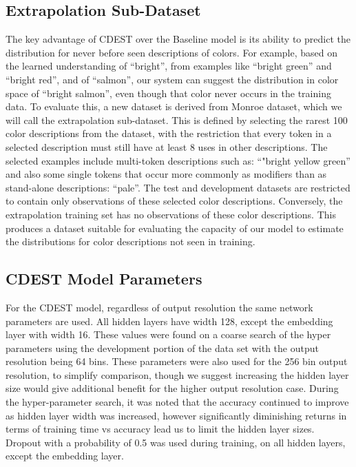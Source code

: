 \documentclass[11pt,letterpaper]{article}
\newcommand{\parencite}{\cite}
\begin{document}
\subsection{Extrapolation Sub-Dataset}
The key advantage of CDEST over the Baseline model is its ability to predict the distribution for never before seen descriptions of colors.
For example, based on the learned understanding of ``bright'', from examples like ``bright green'' and ``bright red'', and of ``salmon'', our system can suggest the distribution in color space of ``bright salmon'', even though that color never occurs in the training data.
To evaluate this, a new dataset is derived from Monroe dataset, which we will call the extrapolation sub-dataset.
This is defined by selecting the rarest 100 color descriptions from the dataset,
with the restriction that every token in a selected description must still have at least 8 uses in other descriptions.
The selected examples include multi-token descriptions such as: ``"bright yellow green'' and also some single tokens that occur more commonly as modifiers than as stand-alone descriptions: ``pale''.
The test and development datasets are restricted to contain only observations of these selected color descriptions.
Conversely, the extrapolation training set has no observations of these color descriptions.
This produces a dataset suitable for evaluating the capacity of our model to estimate the distributions for color descriptions not seen in training.

\subsection{CDEST Model Parameters}
For the CDEST model, regardless of output resolution the same network parameters are used.
All hidden layers have width 128, except the embedding layer with width 16.
These values were found on a coarse search of the hyper parameters using the development portion of the data set with the output resolution being 64 bins.
These parameters were also used for the 256 bin output resolution, to simplify comparison, though we suggest increasing the hidden layer size would give additional benefit for the higher output resolution case.
During the hyper-parameter search, it was noted that the accuracy continued to improve as hidden layer width was increased,
however significantly diminishing returns in terms of training time vs accuracy lead us to limit the hidden layer sizes.
Dropout \parencite{srivastava2014dropout} with a probability of 0.5 was used during training, on all hidden layers, except the embedding layer.
\end{document}
